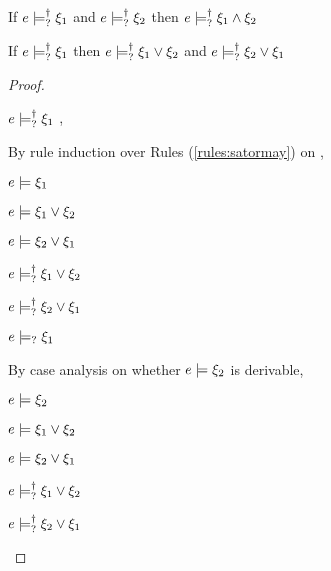 \begin{lem}
  \label{lem:satormay-and}
  If $e \models_{?}^{\dag} \xi_1$ and $e \models_{?}^{\dag} \xi_2$ then $e \models_{?}^{\dag} \xi_1 \wedge \xi_2$
\end{lem}

\begin{lem}
  \label{lem:satormay-or}
  If $e \models_{?}^{\dag} \xi_1$ then $e \models_{?}^{\dag} \xi_1 \vee \xi_2$ and
$e \models_{?}^{\dag} \xi_2 \vee \xi_1$
\end{lem}
\begin{proof}
\begin{pfsteps*}
\item $e \models_{?}^{\dag} \xi_1$  ,
\end{pfsteps*}
By rule induction over Rules (\ref{rules:satormay}) on ,
\begin{byCases}
\item[\text{(\ref{rule:CSMSSat})}]
  \begin{pfsteps*}
  \item $e \models \xi_1$  
  \item $e \models \xi_1 \vee \xi_2$  
  \item $e \models \xi_2 \vee \xi_1$  
  \item $e \models_{?}^{\dag} \xi_1 \vee \xi_2$ 
  \item $e \models_{?}^{\dag} \xi_2 \vee \xi_1$ 
  \end{pfsteps*}

\item[\text{(\ref{rule:CSMSMay})}]
  \begin{pfsteps*}
  \item $e \models_{?} \xi_1$  
  \end{pfsteps*}
  By case analysis on whether $\csatisfy{e}{\xi_2}$ is derivable,
  \begin{byCases}
  \item[\text{$\csatisfy{e}{\xi_2}$ is derivable}]
    \begin{pfsteps*}
    \item $\csatisfy{e}{\xi_2}$  
    \item $e \models \xi_1 \vee \xi_2$  
    \item $e \models \xi_2 \vee \xi_1$  
    \item $e \models_{?}^{\dag} \xi_1 \vee \xi_2$ 
    \item $e \models_{?}^{\dag} \xi_2 \vee \xi_1$ 
    \end{pfsteps*}


\end{byCases}
\end{byCases}
\end{proof}
